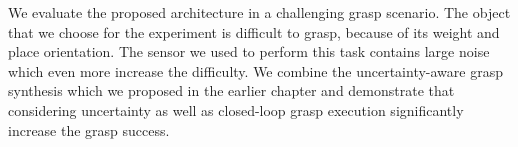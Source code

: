 We evaluate the proposed architecture in a challenging grasp scenario. The object that we choose for the experiment is difficult to grasp, because of its weight and place orientation. The sensor we used to perform this task contains large noise which even more increase the difficulty. We combine the uncertainty-aware grasp synthesis which we proposed in the earlier chapter and demonstrate that considering uncertainty as well as closed-loop grasp execution significantly increase the grasp success.

